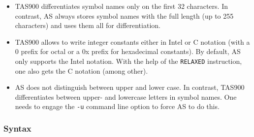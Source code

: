\documentclass[12pt,twoside]{report}
\newcommand{\tty}[1]{{\tt #1}}
\begin{document}
\begin{itemize}
\item{TAS900 differentiates symbol names only on the first 32
      characters.  In contrast, AS always stores symbol names with the
      full length (up to 255 characters) and uses them all for
      differentiation.}
\item{TAS900 allows to write integer constants either in Intel or C
      notation (with a 0 prefix for octal or a 0x prefix for hexadecimal
      constants).  By default, AS only supports the Intel notation. 
      With the help of the \tty{RELAXED} instruction, one also gets the C
      notation (among other).}
\item{AS does not distinguish between upper and lower case.  In
      contrast, TAS900 differentiates between upper- and lowercase
      letters in symbol names.  One needs to engage the \tty{-u} command
      line option to force AS to do this.}
\end{itemize}

\subsubsection{Syntax}
\end{document}
